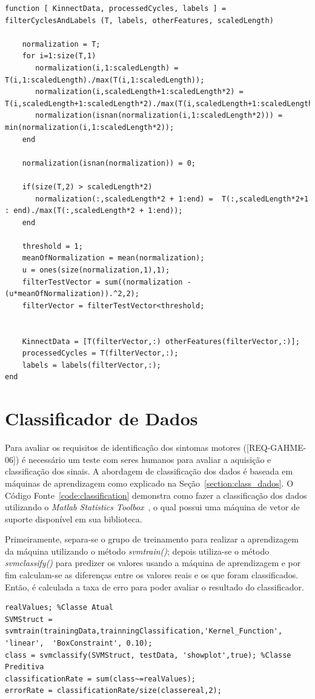 	\begin{lstlisting}[frame=single, caption=Calcular Velociodade Angular Adução e Abdução, label=code:filtercycles]
function [ KinnectData, processedCycles, labels ] = filterCyclesAndLabels (T, labels, otherFeatures, scaledLength)

    normalization = T;
    for i=1:size(T,1)
       normalization(i,1:scaledLength) = T(i,1:scaledLength)./max(T(i,1:scaledLength));
       normalization(i,scaledLength+1:scaledLength*2) = T(i,scaledLength+1:scaledLength*2)./max(T(i,scaledLength+1:scaledLength*2));
       normalization(isnan(normalization(i,1:scaledLength*2))) = min(normalization(i,1:scaledLength*2));
    end
    
    normalization(isnan(normalization)) = 0;
    
    if(size(T,2) > scaledLength*2) 
       normalization(:,scaledLength*2 + 1:end) =  T(:,scaledLength*2+1 : end)./max(T(:,scaledLength*2 + 1:end));
    end
    
    threshold = 1;
    meanOfNormalization = mean(normalization);
    u = ones(size(normalization,1),1);
    filterTestVector = sum((normalization - (u*meanOfNormalization)).^2,2);
    filterVector = filterTestVector<threshold;
    
       
    KinnectData = [T(filterVector,:) otherFeatures(filterVector,:)];
    processedCycles = T(filterVector,:);
    labels = labels(filterVector,:);    
end
\end{lstlisting}	


\section{Classificador de Dados}
Para avaliar os requisitos de identificação dos sintomas motores ([REQ-GAHME-06]) é necessário um teste com seres humanos para avaliar a aquisição e classificação dos sinais. A abordagem de classificação dos dados é baseada em máquinas de aprendizagem como explicado na Seção~\ref{section:class_dados}. O Código Fonte~\ref{code:classification} demonstra como fazer a classificação dos dados utilizando o \textit{Matlab Statistics Toolbox}~\cite{matlab2011}, o qual possui uma máquina de vetor de suporte disponível em sua biblioteca.

Primeiramente, separa-se o grupo de treinamento para realizar a aprendizagem da máquina utilizando o método \textit{svmtrain()}; depois utiliza-se o método \textit{svmclassify()} para predizer os valores usando a máquina de aprendizagem  e por fim calculam-se as diferenças entre os valores reais e os que foram classificados. Então, é calculada a taxa de erro para poder avaliar o resultado do classificador.

\begin{lstlisting}[frame=single, caption=Uso de Máquina de Vetor de Suporte para Classificação dos Dados, label=code:classification]
realValues; %Classe Atual
SVMStruct = svmtrain(trainingData,trainningClassification,'Kernel_Function', 'linear',	'BoxConstraint', 0.10);
class = svmclassify(SVMStruct, testData, 'showplot',true); %Classe Preditiva
classificationRate = sum(class~=realValues);
errorRate = classificationRate/size(classereal,2);
\end{lstlisting}
